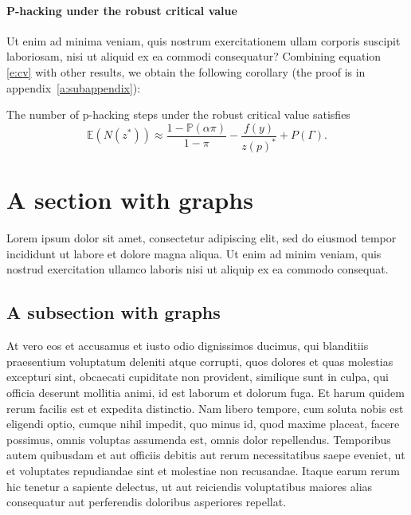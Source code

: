 \documentclass[letterpaper,12pt,leqno]{article}
\begin{document}
\paragraph{P-hacking under the robust critical value} Ut enim ad minima veniam, quis nostrum exercitationem ullam corporis suscipit laboriosam, nisi ut aliquid ex ea commodi consequatur? Combining equation \eqref{e:cv} with other results, we obtain the following corollary (the proof is in appendix~\ref{a:subappendix}): 

\begin{corollary} The number of p-hacking steps under the robust critical value satisfies
\begin{equation*}
\mathbb{E}(N(z^*)) \approx \frac{1-\mathbb{P}(\alpha\pi)}{1-\pi}- \frac{f(y)}{z(p)^*} +P(\Gamma).
\end{equation*}\end{corollary}

\section{A section with graphs}\label{s:graphs}

Lorem ipsum dolor sit amet, consectetur adipiscing elit, sed do eiusmod tempor incididunt ut labore et dolore magna aliqua. Ut enim ad minim veniam, quis nostrud exercitation ullamco laboris nisi ut aliquip ex ea commodo consequat.

\subsection{A subsection with graphs}

At vero eos et accusamus et iusto odio dignissimos ducimus, qui blanditiis praesentium voluptatum deleniti atque corrupti, quos dolores et quas molestias excepturi sint, obcaecati cupiditate non provident, similique sunt in culpa, qui officia deserunt mollitia animi, id est laborum et dolorum fuga. Et harum quidem rerum facilis est et expedita distinctio. Nam libero tempore, cum soluta nobis est eligendi optio, cumque nihil impedit, quo minus id, quod maxime placeat, facere possimus, omnis voluptas assumenda est, omnis dolor repellendus. Temporibus autem quibusdam et aut officiis debitis aut rerum necessitatibus saepe eveniet, ut et voluptates repudiandae sint et molestiae non recusandae. Itaque earum rerum hic tenetur a sapiente delectus, ut aut reiciendis voluptatibus maiores alias consequatur aut perferendis doloribus asperiores repellat. 
\end{document}
